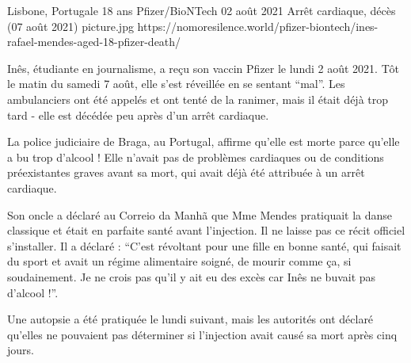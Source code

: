 {Lisbone, Portugale}
{18 ans}
{Pfizer/BioNTech}
{02 août 2021}
{Arrêt cardiaque, décès (07 août 2021)}
{picture.jpg}
{https://nomoresilence.world/pfizer-biontech/ines-rafael-mendes-aged-18-pfizer-death/}
{

Inês, étudiante en journalisme, a reçu son vaccin Pfizer le lundi 2 août
2021. Tôt le matin du samedi 7 août, elle s'est réveillée en se sentant
“mal”. Les ambulanciers ont été appelés et ont tenté de la ranimer, mais il
était déjà trop tard - elle est décédée peu après d'un arrêt cardiaque.

La police judiciaire de Braga, au Portugal, affirme qu'elle est morte parce
qu'elle a bu trop d'alcool ! Elle n'avait pas de problèmes cardiaques ou de
conditions préexistantes graves avant sa mort, qui avait déjà été attribuée à un
arrêt cardiaque.

Son oncle a déclaré au Correio da Manhã que Mme Mendes pratiquait la danse
classique et était en parfaite santé avant l'injection. Il ne laisse pas ce
récit officiel s'installer. Il a déclaré : “C'est révoltant pour une fille en
bonne santé, qui faisait du sport et avait un régime alimentaire soigné, de
mourir comme ça, si soudainement. Je ne crois pas qu'il y ait eu des excès car
Inês ne buvait pas d'alcool !”.

Une autopsie a été pratiquée le lundi suivant, mais les autorités ont déclaré
qu'elles ne pouvaient pas déterminer si l'injection avait causé sa mort après
cinq jours.

}
